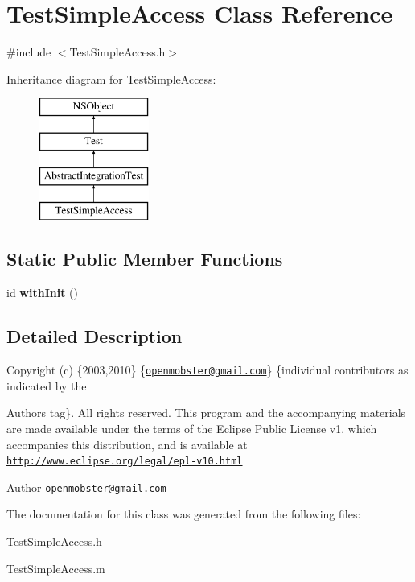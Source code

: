 \hypertarget{interface_test_simple_access}{
\section{\-Test\-Simple\-Access \-Class \-Reference}
\label{interface_test_simple_access}
}


{\ttfamily \#include $<$\-Test\-Simple\-Access.\-h$>$}

\-Inheritance diagram for \-Test\-Simple\-Access\-:\begin{figure}[H]
\begin{center}
\leavevmode
\includegraphics[height=4.000000cm]{interface_test_simple_access}
\end{center}
\end{figure}
\subsection*{\-Static \-Public \-Member \-Functions}
\begin{DoxyCompactItemize}
\item 
\hypertarget{interface_test_simple_access_a88acfc47f79b02040b91212af9a23077}{
id {\bfseries with\-Init} ()}
\label{interface_test_simple_access_a88acfc47f79b02040b91212af9a23077}

\end{DoxyCompactItemize}


\subsection{\-Detailed \-Description}
\-Copyright (c) \{2003,2010\} \{\href{mailto:openmobster@gmail.com}{\tt openmobster@gmail.\-com}\} \{individual contributors as indicated by the \begin{DoxyAuthor}{\-Authors}
tag\}. \-All rights reserved. \-This program and the accompanying materials are made available under the terms of the \-Eclipse \-Public \-License v1. which accompanies this distribution, and is available at \href{http://www.eclipse.org/legal/epl-v10.html}{\tt http\-://www.\-eclipse.\-org/legal/epl-\/v10.\-html}
\end{DoxyAuthor}
\begin{DoxyAuthor}{\-Author}
\href{mailto:openmobster@gmail.com}{\tt openmobster@gmail.\-com} 
\end{DoxyAuthor}


\-The documentation for this class was generated from the following files\-:\begin{DoxyCompactItemize}
\item 
\-Test\-Simple\-Access.\-h\item 
\-Test\-Simple\-Access.\-m\end{DoxyCompactItemize}
